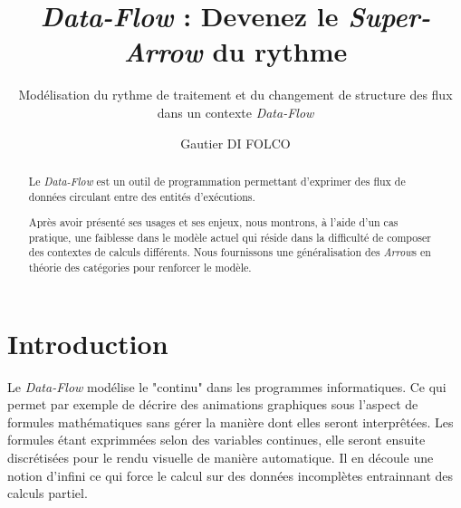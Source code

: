 \documentclass{llncs}
\newcommand{\DF}{\emph{Data-Flow} }
\newcommand{\SA}{\emph{Super-Arrow} }
\newcommand{\Arrs}{\emph{Arrow}s }
\begin{document}
\title{\DF : Devenez le \SA du rythme}


\subtitle{Modélisation du rythme de traitement et du changement de structure des flux dans un contexte \DF}


\author{Gautier DI FOLCO}







\maketitle

\begin{abstract}
Le \DF est un outil de programmation permettant d'exprimer des flux de
données circulant entre des entités d'exécutions.

Après avoir présenté ses usages et ses enjeux, nous montrons, à l'aide d'un
cas pratique, une faiblesse dans le modèle actuel qui réside dans la difficulté
de composer des contextes de calculs différents.
Nous fournissons une généralisation des \Arrs en théorie des catégories pour
renforcer le modèle.
\end{abstract}

\section{Introduction}
Le \DF modélise le "continu" dans les programmes informatiques.
Ce qui permet par exemple de décrire des animations graphiques sous l'aspect de
formules mathématiques sans gérer la manière dont elles seront interprêtées.
Les formules étant exprimmées selon des variables continues, elle seront ensuite
discrétisées pour le rendu visuelle de manière automatique.
Il en découle une notion d'infini ce qui force le calcul sur des données incomplètes
entrainnant des calculs partiel.
\end{document}
